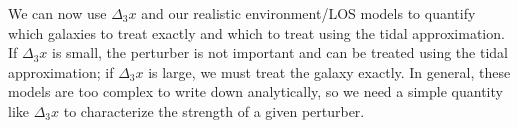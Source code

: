 We can now use $\Delta_3 x$ and our realistic environment/LOS models to quantify which galaxies to treat exactly and which to treat using the tidal approximation. If $\Delta_3x$ is small, the perturber is not important and can be treated using the tidal approximation; if $\Delta_3 x$ is large, we must treat the galaxy exactly. In general, these models are too complex to write down analytically, so we need a simple quantity like $\Delta_3 x$ to characterize the strength of a given perturber. 
  